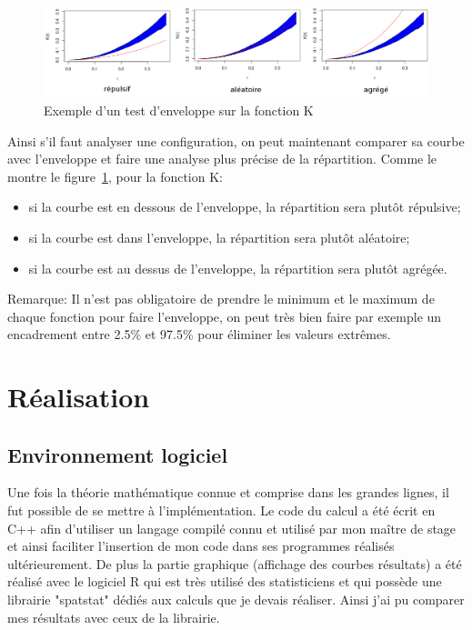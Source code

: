 \documentclass[stage2a]{tnreport}
\begin{document}
\begin{figure}[h]
  \centering
  \includegraphics[scale=0.45]{figures/exempleEnveloppes.png}
  \caption{Exemple d'un test d'enveloppe sur la fonction K}
  \label{fig:enveloppeK}
\end{figure}

Ainsi s'il faut analyser une configuration, on peut maintenant comparer sa courbe avec l'enveloppe et faire une analyse plus précise de la répartition. Comme le montre le figure~\ref{fig:enveloppeK}, pour la fonction K: 
\begin{itemize}
\item si la courbe est en dessous de l'enveloppe, la répartition sera plutôt répulsive;
\item si la courbe est dans l'enveloppe, la répartition sera plutôt aléatoire;
\item si la courbe est au dessus de l'enveloppe, la répartition sera plutôt agrégée.\\
\end{itemize}

Remarque: Il n'est pas obligatoire de prendre le minimum et le maximum de chaque fonction pour faire l'enveloppe, on peut très bien faire par exemple un encadrement entre 2.5\% et 97.5\% pour éliminer les valeurs extrêmes.


\newpage


\chapter{Réalisation}

\section{Environnement logiciel}

Une fois la théorie mathématique connue et comprise dans les grandes lignes, il fut possible de se mettre à l'implémentation. Le code du calcul a été écrit en C++ afin d'utiliser un langage compilé connu et utilisé par mon maître de stage et ainsi faciliter l'insertion de mon code dans ses programmes réalisés ultérieurement. De plus la partie graphique (affichage des courbes résultats) a été réalisé avec le logiciel R qui est très utilisé des statisticiens et qui possède une librairie "spatstat" dédiés aux calculs que je devais réaliser. Ainsi j'ai pu comparer mes résultats avec ceux de la librairie.\\
\end{document}
